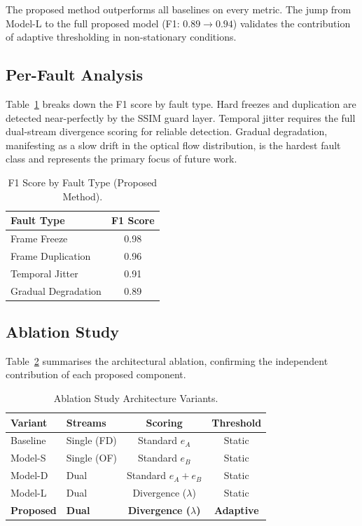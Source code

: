 \documentclass[runningheads]{llncs}
\begin{document}
The proposed method outperforms all baselines on every metric. The jump
from Model-L to the full proposed model (F1: $0.89 \rightarrow 0.94$)
validates the contribution of adaptive thresholding in non-stationary
conditions.

\subsection{Per-Fault Analysis}
Table~\ref{tab:perfault} breaks down the F1 score by fault type. Hard
freezes and duplication are detected near-perfectly by the SSIM guard
layer. Temporal jitter requires the full dual-stream divergence scoring
for reliable detection. Gradual degradation, manifesting as a slow drift
in the optical flow distribution, is the hardest fault class and
represents the primary focus of future work.

\begin{table}[ht]
\centering
\caption{F1 Score by Fault Type (Proposed Method).}
\label{tab:perfault}
\begin{tabular}{lc}
\toprule
\textbf{Fault Type}  & \textbf{F1 Score} \\
\midrule
Frame Freeze         & 0.98 \\
Frame Duplication    & 0.96 \\
Temporal Jitter      & 0.91 \\
Gradual Degradation  & 0.89 \\
\bottomrule
\end{tabular}
\end{table}

\subsection{Ablation Study}
Table~\ref{tab:ablation} summarises the architectural ablation, confirming
the independent contribution of each proposed component.

\begin{table}[ht]
\centering
\caption{Ablation Study Architecture Variants.}
\label{tab:ablation}
\begin{tabular}{llcc}
\toprule
\textbf{Variant} & \textbf{Streams} & \textbf{Scoring} & \textbf{Threshold} \\
\midrule
Baseline          & Single (FD)  & Standard $e_A$               & Static   \\
Model-S           & Single (OF)  & Standard $e_B$               & Static   \\
Model-D           & Dual         & Standard $e_A+e_B$           & Static   \\
Model-L           & Dual         & Divergence ($\lambda$)       & Static   \\
\textbf{Proposed} & \textbf{Dual}& \textbf{Divergence ($\lambda$)} & \textbf{Adaptive} \\
\bottomrule
\end{tabular}
\end{table}
\end{document}

